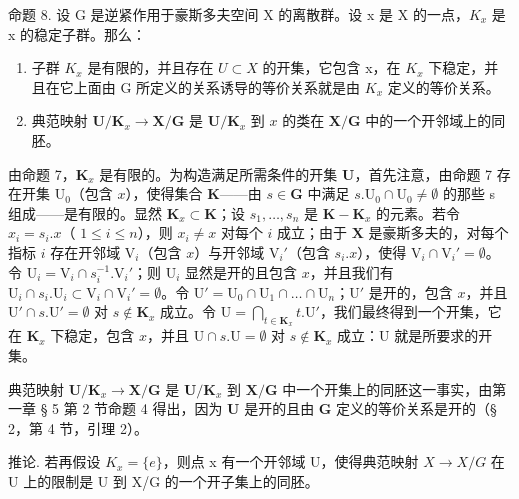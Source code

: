 命题 8. 设 G 是逆紧作用于豪斯多夫空间 X 的离散群。设 x 是 X 的一点，\(K_{x}\) 是 x 的稳定子群。那么：

\begin{enumerate}
\def\labelenumi{\alph{enumi})}
\item
  子群 \(K_{x}\) 是有限的，并且存在 \(U \subset X\) 的开集，它包含 x，在 \(K_{x}\) 下稳定，并且在它上面由 G 所定义的关系诱导的等价关系就是由 \(K_{x}\) 定义的等价关系。
\item
  典范映射 \(\mathbf{U} / \mathbf{K}_x\to \mathbf{X} / \mathbf{G}\) 是 \(\mathbf{U} / \mathbf{K}_x\) 到 \(x\) 的类在 \(\mathbf{X} / \mathbf{G}\) 中的一个开邻域上的同胚。
\end{enumerate}

由命题 7，\(\mathbf{K}_x\) 是有限的。为构造满足所需条件的开集 \(\mathbf{U}\)，首先注意，由命题 7 存在开集 \(\mathrm{U}_0\)（包含 \(x\)），使得集合 \(\mathbf{K}\)——由 \(s \in \mathbf{G}\) 中满足 \(s. \mathrm{U}_0 \cap \mathrm{U}_0 \neq \emptyset\) 的那些 s 组成——是有限的。显然 \(\mathbf{K}_x \subset \mathbf{K}\)；设 \(s_1, \ldots, s_n\) 是 \(\mathbf{K} - \mathbf{K}_x\) 的元素。若令 \(x_i = s_i.x\)（ \(1 \leqslant i \leqslant n\)），则 \(x_i \neq x\) 对每个 \(i\) 成立；由于 \(\mathbf{X}\) 是豪斯多夫的，对每个指标 \(i\) 存在开邻域 \(\mathrm{V}_i\)（包含 \(x\)）与开邻域 \(\mathrm{V}_i'\)（包含 \(s_i.x\)），使得 \(\mathrm{V}_i \cap \mathrm{V}_i' = \emptyset\)。令 \(\mathrm{U}_i = \mathrm{V}_i \cap s_i^{-1}. \mathrm{V}_i'\)；则 \(\mathrm{U}_i\) 显然是开的且包含 \(x\)，并且我们有 \(\mathrm{U}_i \cap s_i. \mathrm{U}_i \subset \mathrm{V}_i \cap \mathrm{V}_i' = \emptyset\)。令 \(\mathrm{U}' = \mathrm{U}_0 \cap \mathrm{U}_1 \cap \ldots \cap \mathrm{U}_n\)；\(\mathrm{U}'\) 是开的，包含 \(x\)，并且 \(\mathrm{U}' \cap s. \mathrm{U}' = \emptyset\) 对 \(s \notin \mathbf{K}_x\) 成立。令 \(\mathrm{U} = \bigcap_{t \in \mathbf{K}_x} t. \mathrm{U}'\)，我们最终得到一个开集，它在 \(\mathbf{K}_x\) 下稳定，包含 \(x\)，并且 \(\mathrm{U} \cap s. \mathrm{U} = \emptyset\) 对 \(s \notin \mathbf{K}_x\) 成立：\(\mathrm{U}\) 就是所要求的开集。

典范映射 \(\mathbf{U} / \mathbf{K}_x\to \mathbf{X} / \mathbf{G}\) 是 \(\mathbf{U} / \mathbf{K}_x\) 到 \(\mathbf{X} / \mathbf{G}\) 中一个开集上的同胚这一事实，由第一章 § 5 第 2 节命题 4 得出，因为 \(\mathbf{U}\) 是开的且由 \(\mathbf{G}\) 定义的等价关系是开的（§ 2，第 4 节，引理 2）。

推论. 若再假设 \(K_{x}=\{e\}\)，则点 x 有一个开邻域 U，使得典范映射 \(X\to X/G\) 在 U 上的限制是 U 到 X/G 的一个开子集上的同胚。

